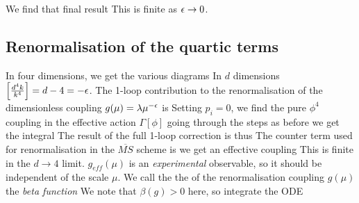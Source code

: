 \documentclass{article}
\begin{document}
We find that final result 
This is finite as $\epsilon \to 0$. 

\subsection{Renormalisation of the quartic terms}

In four dimensions, we get the various diagrams 
In $d$ dimensions $\left[ \frac{d^4 k }{k^4} \right] = d-4 = -\epsilon$. The 1-loop contribution to the renormalisation of the dimensionless coupling $g(\mu) = \lambda \mu^{-\epsilon}$ is 
Setting $p_i=0$, we find the pure $\phi^4$ coupling in the effective action $\Gamma[\phi]$
going through the steps as before we get the integral 
The result of the full 1-loop correction is thus 
The counter term used for renormalisation in the $\overline{MS}$ scheme is 
we get an effective coupling 
This is finite in the $d\to 4$ limit. $g_{eff}(\mu)$ is an \emph{experimental} observable, so it should be independent of the scale $\mu$. 
We call the the  of the renormalisation coupling $g(\mu)$ the \emph{beta function} 
We note that $\beta(g) > 0$ here, so integrate the ODE 
\end{document}
